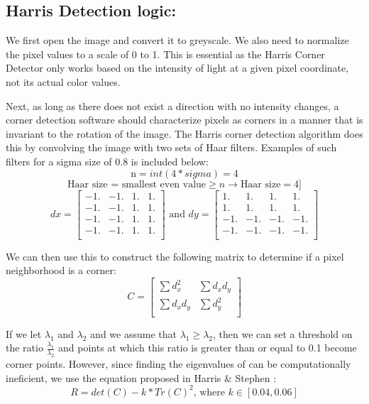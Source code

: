 \documentclass{article}
\begin{document}
\subsection{Harris Detection logic: }\label{sec:Harris}
We first open the image and convert it to greyscale. We also need to normalize the pixel values to a scale of 0 to 1. This is essential as the Harris Corner Detector only works based on the intensity of light at a given pixel coordinate, not its actual color values.

Next, as long as there does not exist a direction with no intensity changes, a corner detection software should characterize pixels as corners in a manner that is invariant to the rotation of the image. The Harris corner detection algorithm does this by convolving the image with two sets of Haar filters. Examples of such filters for a sigma size of 0.8 is included below:
\[\text{n} = int(4 * sigma) = 4\]
\[\text{Haar size = smallest even value} \geq n \rightarrow \text{Haar size} = 4]\]
\[dx = \begin{bmatrix}
    -1. & -1. & 1. &  1. \\
    -1. & -1. & 1. &  1. \\
    -1. & -1. & 1. &  1. \\
    -1. & -1. &  1. &  1. \\
\end{bmatrix}\text{ and } dy = \begin{bmatrix}
    1. & 1. & 1. &  1. \\
    1. & 1. & 1. &  1. \\
    -1. & -1. & -1. &  -1. \\
    -1. & -1. &  -1. &  -1. \\
\end{bmatrix}\]

We can then use this to construct the following matrix to determine if a pixel neighborhood is a corner:
\[C = \begin{bmatrix}
    \sum d_x ^2 & \sum d_x d_y \\
    \sum d_x d_y & \sum d_y ^2 \\
\end{bmatrix} \]

If we let $\lambda_1$ and $\lambda_2$ and we assume that $\lambda_1 \geq \lambda_2$, then we can set a threshold on the ratio $\frac{\lambda_1}{\lambda_2}$ and points at which this ratio is greater than or equal to 0.1 become corner points. However, since finding the eigenvalues of can be computationally ineficient, we use the equation proposed in Harris \& Stephen \cite{Harris1988ACC}:
\[R = det(C) - k * Tr(C)^2 \text{, where } k \in [0.04, 0.06]\]
\end{document}
